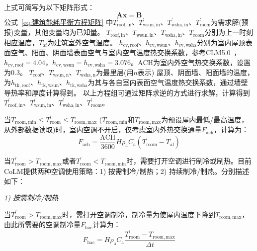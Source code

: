 \noindent 上式可简写为以下矩阵形式：
\begin{equation}
  \mathbf{Ax}=\mathbf{B}
\end{equation}
公式~\eqref{eq:建筑能耗平衡方程矩阵} 中$T_{\mathrm{roof,in}}^\prime$、$T_{\mathrm{wsun,in}}^\prime$、$T_{\mathrm{wsha,in}}^\prime$、$T_{\mathrm{room}}^\prime$为需求解(预报)变量，其他变量均为已知量。
$T_{\mathrm{roof,in}}$、$T_{\mathrm{wsun,in}}$、$T_{\mathrm{wsha,in}}$、$T_{\mathrm{room}}$分别为上一时刻相应温度，$T_{\mathrm{af}}$为建筑室外空气温度。
$h_{\mathrm{cv,roof}}$、$h_{\mathrm{cv,wsun}}$、$h_{\mathrm{cv,wsha}}$分别为室内屋顶表面空气、阳面、阴面墙表面空气与室内空气温度热交换系数，参考CLM5.0~\citep{oleson2020parameterization}，$h_{\mathrm{cv,roof}}=4.04$，$h_{\mathrm{cv,wsun}}=h_{\mathrm{cv,wsha}}=3.076$。$\mathrm {ACH}$为室内外空气热交换系数，设置为0.3。
$T_{\mathrm{roof}}$、$T_{\mathrm{wsun,n}}$、$T_{\mathrm{wsha,n}}$为最里层(用$n$表示)
屋顶、阴面墙、阳面墙的温度，为$h_{\mathrm{tk,roof}}$、$h_{\mathrm{tk,wsun}}$、$h_{\mathrm{tk,wsha}}$为其与各自室内表面空气温度热交换系数，通过墙壁导热率和厚度计算得到。
以上方程组可通过矩阵求逆的方式进行求解，计算得到$T_{\mathrm{roof,in}}^\prime$、$T_{\mathrm{wsun,in}}^\prime$、$T_{\mathrm{wsha,in}}^\prime$、$T_{\mathrm{room}}^\prime$。

当$T_{\mathrm{room,min}}\leqslant T_{\mathrm{room}}^\prime \leqslant T_{\mathrm{room,max}} $ ($T_{\mathrm{room,min}}$和$T_{\mathrm{room,max}}$为预设屋内最低/最高温度，从外部数据读取)时，室内空调不开启，仅考虑室内外热交换通量$F_{\mathrm{ach}}$，计算为：
\begin{equation}
  F_{\mathrm{a c h}}=\frac{\mathrm {ACH}}{3600} H \rho_{\mathrm{a}} C_{\mathrm{a}}\left(T_{\mathrm{{room }}}^{\prime}-T_{\mathrm{a f}}\right)
\end{equation}

当$T_{\mathrm{room}}^\prime>T_{\mathrm{room,max}}$或者$T_{\mathrm{room}}^\prime<T_{\mathrm{room,min}}$时，需要打开空调进行制冷或制热。目前CoLM提供两种空调使用策略：1) 按需制冷/制热；2) 持续制冷/制热。分别描述如下：

\textit{1) 按需制冷/制热}

当$T_{\mathrm{room}}^\prime>T_{\mathrm{room,max}}$时，需打开空调制冷，制冷量为使屋内温度下降到$T_{\mathrm{room,max}}$，由此所需要的空调制冷量$F_{\mathrm{hac}}$计算为：
\begin{equation}
  F_{\mathrm{{hac }}}=H \rho_{\mathrm{a}} C_{\mathrm{a}} \frac{T_{\mathrm{{room }}}^{\prime}-T_{\mathrm{{room,max }}}}{\Delta t}
\end{equation}

